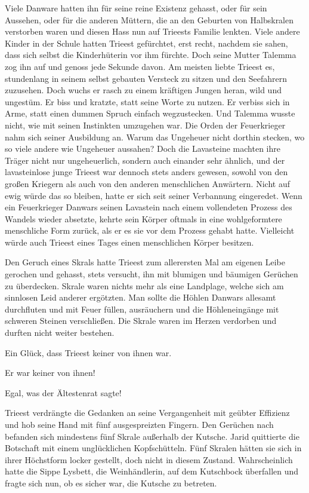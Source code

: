 Viele Danware hatten ihn für seine reine Existenz gehasst, oder für sein Aussehen, oder für die anderen Müttern, die an den Geburten von Halbskralen verstorben waren und diesen Hass nun auf Trieests Familie lenkten. Viele andere Kinder in der Schule hatten Trieest gefürchtet, erst recht, nachdem sie sahen, dass sich selbst die Kinderhüterin vor ihm fürchte. Doch seine Mutter Talemma zog ihn auf und genoss jede Sekunde davon. Am meisten liebte Trieest es, stundenlang in seinem selbst gebauten Versteck zu sitzen und den Seefahrern zuzusehen. Doch wuchs er rasch zu einem kräftigen Jungen heran, wild und ungestüm. Er biss und kratzte, statt seine Worte zu nutzen. Er verbiss sich in Arme, statt einen dummen Spruch einfach wegzustecken. Und Talemma wusste nicht, wie mit seinen Instinkten umzugehen war. Die Orden der Feuerkrieger nahm sich seiner Ausbildung an. Warum das Ungeheuer nicht dorthin stecken, wo so viele andere wie Ungeheuer aussahen? Doch die Lavasteine machten ihre Träger nicht nur ungeheuerlich, sondern auch einander sehr ähnlich, und der lavasteinlose junge Trieest war dennoch stets anders gewesen, sowohl von den großen Kriegern als auch von den anderen menschlichen Anwärtern. Nicht auf ewig würde das so bleiben, hatte er sich seit seiner Verbannung eingeredet. Wenn ein Feuerkrieger Danwars seinen Lavastein nach einem vollendeten Prozess des Wandels wieder absetzte, kehrte sein Körper oftmals in eine wohlgeformtere menschliche Form zurück, als er es sie vor dem Prozess gehabt hatte. Vielleicht würde auch Trieest eines Tages einen menschlichen Körper besitzen.

Den Geruch eines Skrals hatte Trieest zum allerersten Mal am eigenen Leibe gerochen und gehasst, stets versucht, ihn mit blumigen und bäumigen Gerüchen zu überdecken. Skrale waren nichts mehr als eine Landplage, welche sich am sinnlosen Leid anderer ergötzten. Man sollte die Höhlen Danwars allesamt durchfluten und mit Feuer füllen, ausräuchern und die Höhleneingänge mit schweren Steinen verschließen. Die Skrale waren im Herzen verdorben und durften nicht weiter bestehen.

Ein Glück, dass Trieest keiner von ihnen war.

Er war keiner von ihnen!

Egal, was der Ältestenrat sagte!



\trennzeichen



Trieest verdrängte die Gedanken an seine Vergangenheit mit geübter Effizienz und hob seine Hand mit fünf ausgespreizten Fingern. Den Gerüchen nach befanden sich mindestens fünf Skrale außerhalb der Kutsche. Jarid quittierte die Botschaft mit einem unglücklichen Kopfschütteln. Fünf Skralen hätten sie sich in ihrer Höchstform locker gestellt, doch nicht in diesem Zustand. Wahrscheinlich hatte die Sippe Lysbett, die Weinhändlerin, auf dem Kutschbock überfallen und fragte sich nun, ob es sicher war, die Kutsche zu betreten.

